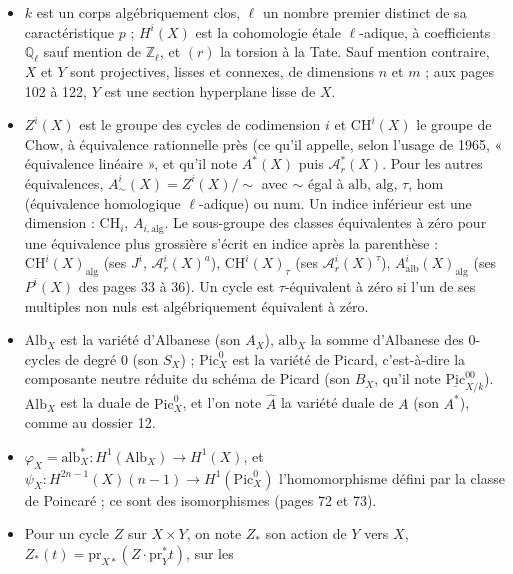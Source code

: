 \documentclass[11pt,a4paper]{article}
\begin{document}
\begin{itemize}
  \item $k$ est un corps algébriquement clos, $\ell$ un nombre premier distinct
  de sa caractéristique $p$ ; $H^{i}(X)$ est la cohomologie étale $\ell$-adique,
  à coefficients $\mathbb{Q}_{\ell}$ sauf mention de $\mathbb{Z}_{\ell}$, et
  $(r)$ la torsion à la Tate. Sauf mention contraire, $X$ et $Y$ sont
  projectives, lisses et connexes, de dimensions $n$ et $m$ ; aux pages 102 à
  122, $Y$ est une section hyperplane lisse de $X$.
  \item $Z^{i}(X)$ est le groupe des cycles de codimension $i$ et
  $\mathrm{CH}^{i}(X)$ le groupe de Chow, à équivalence rationnelle près
  (ce qu'il appelle, selon l'usage de 1965, « équivalence linéaire », et qu'il
  note $A^{*}(X)$ puis $\mathcal{A}^{*}_{r}(X)$. Pour les autres équivalences,
  $A^{i}_{\sim}(X) = Z^{i}(X)/\!\sim$ avec $\sim$ égal à $\mathrm{alb}$,
  $\mathrm{alg}$, $\tau$, $\mathrm{hom}$ (équivalence homologique
  $\ell$-adique) ou $\mathrm{num}$. Un indice inférieur est une dimension :
  $\mathrm{CH}_{i}$, $A_{i,\mathrm{alg}}$. Le sous-groupe des classes
  équivalentes à zéro pour une équivalence plus grossière s'écrit en indice
  après la parenthèse : $\mathrm{CH}^{i}(X)_{\mathrm{alg}}$ (ses $J^{i}$,
  $\mathcal{A}^{i}_{r}(X)^{a}$), $\mathrm{CH}^{i}(X)_{\tau}$ (ses
  $\mathcal{A}^{i}_{r}(X)^{\tau}$), $A^{i}_{\mathrm{alb}}(X)_{\mathrm{alg}}$ (ses
  $P^{i}(X)$ des pages 33 à 36). Un cycle est $\tau$-équivalent à zéro si l'un
  de ses multiples non nuls est algébriquement équivalent à zéro.
  \item $\mathrm{Alb}_{X}$ est la variété d'Albanese (son $A_{X}$),
  $\mathrm{alb}_{X}$ la somme d'Albanese des $0$-cycles de degré $0$ (son
  $S_{X}$) ; $\mathrm{Pic}^{0}_{X}$ est la variété de Picard, c'est-à-dire la
  composante neutre réduite du schéma de Picard (son $B_{X}$, qu'il note
  $\underline{\mathrm{Pic}}^{00}_{X/k}$). $\mathrm{Alb}_{X}$ est la duale de
  $\mathrm{Pic}^{0}_{X}$, et l'on note $\hat{A}$ la variété duale de $A$ (son
  $A^{*}$), comme au dossier 12.
  \item $\varphi_{X} = \mathrm{alb}_{X}^{*} \colon H^{1}(\mathrm{Alb}_{X}) \to
  H^{1}(X)$, et $\psi_{X} \colon H^{2n-1}(X)(n-1) \to H^{1}(\mathrm{Pic}^{0}_{X})$
  l'homomorphisme défini par la classe de Poincaré ; ce sont des isomorphismes
  (pages 72 et 73).
  \item Pour un cycle $Z$ sur $X \times Y$, on note $Z_{*}$ son action de $Y$
  vers $X$, $Z_{*}(t) = \mathrm{pr}_{X*}(Z \cdot \mathrm{pr}_{Y}^{*} t)$, sur les

\end{itemize}
\end{document}
